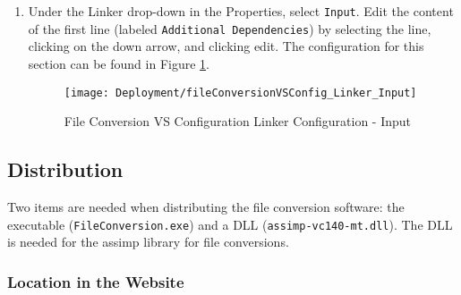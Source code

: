 \begin{enumerate}
            \item Under the Linker drop-down in the Properties, select \texttt{Input}.  Edit the content of the first line (labeled \texttt{Additional Dependencies}) by selecting the line, clicking on the down arrow, and clicking edit.  The configuration for this section can be found in Figure \ref{fig:fileconversionVSConfig2}.

            \begin{figure}[H]
                \texttt{[image: Deployment/fileConversionVSConfig\_Linker\_Input]}
                \centering
                \caption{File Conversion VS Configuration Linker Configuration - Input}
                \label{fig:fileconversionVSConfig2}
            \end{figure}
    \end{enumerate}

    \subsection{Distribution}

        Two items are needed when distributing the file conversion software: the executable (\texttt{FileConversion.exe}) and a DLL (\texttt{assimp-vc140-mt.dll}).  The DLL is needed for the assimp library for file conversions.

        \subsubsection{Location in the Website}